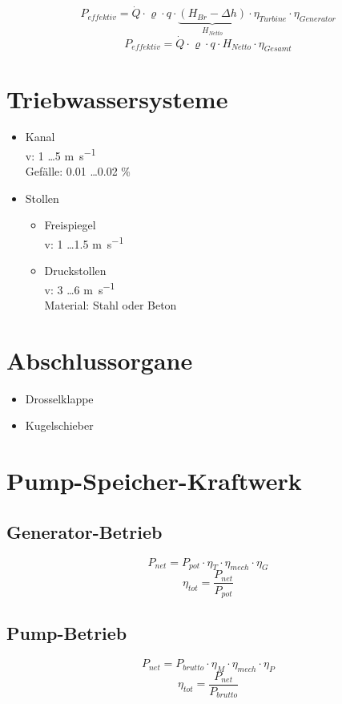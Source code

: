 \documentclass[a4,paper,fleqn]{article}
\begin{document}
\[ P_{effektiv} = \dot{Q} \cdot \varrho \cdot q \cdot \underbrace{(H_{Br} - \Delta h)}_{H_{Netto}}
\cdot \eta_{Turbine} \cdot \eta_{Generator} \]
\[ P_{effektiv} = \dot{Q} \cdot \varrho \cdot q \cdot H_{Netto} \cdot \eta_{Gesamt} \]

\section{Triebwassersysteme}
\begin{itemize}
    \item Kanal \\
        v: 1 \ldots 5 \si{\metre\per\second} \\
        Gefälle: 0.01 \ldots 0.02  \%
    \item Stollen
    \begin{itemize}
        \item Freispiegel \\
            v: 1 \ldots 1.5 \si{\metre\per\second} \\
        \item Druckstollen \\
            v: 3 \ldots 6 \si{\metre\per\second} \\
            Material: Stahl oder Beton
    \end{itemize}
\end{itemize}

\section{Abschlussorgane}
\begin{itemize}
    \item Drosselklappe
    \item Kugelschieber
\end{itemize}

\section{Pump-Speicher-Kraftwerk}
\subsection{Generator-Betrieb}
\[ P_{net} = P_{pot} \cdot \eta_T \cdot \eta_{mech} \cdot \eta_G \]
\[ \eta_{tot} = \frac{P_{net}}{P_{pot}} \]

\subsection{Pump-Betrieb}
\[ P_{net} = P_{brutto} \cdot \eta_M \cdot \eta_{mech} \cdot \eta_P \]
\[ \eta_{tot} = \frac{P_{net}}{P_{brutto}} \]
\end{document}
